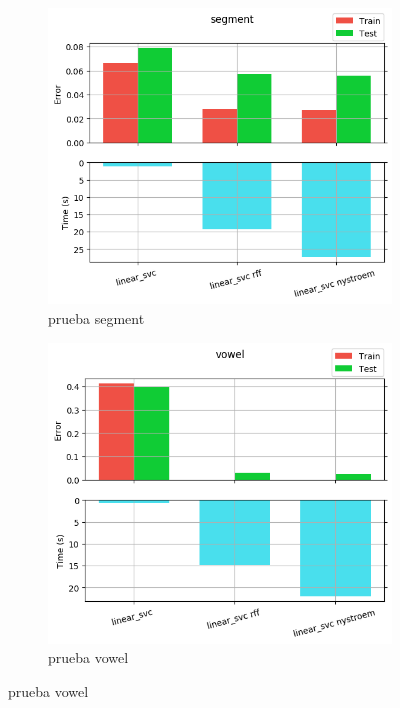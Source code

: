 \begin{figure}[ht]
  \centering
  \begin{subfigure}[b]{0.5\linewidth}
    \centering\captionsetup{width=.8\linewidth}\includegraphics[width=\imgscale\linewidth]{Figures/2_5/segment}
    \caption{prueba segment}
    \label{fig:2_5_segment}
  \end{subfigure}%
  \begin{subfigure}[b]{0.5\linewidth}
    \centering\captionsetup{width=.8\linewidth}\includegraphics[width=\imgscale\linewidth]{Figures/2_5/vowel}
    \caption{prueba vowel}
    \label{fig:2_5_vowel}
  \end{subfigure}
\end{figure}
